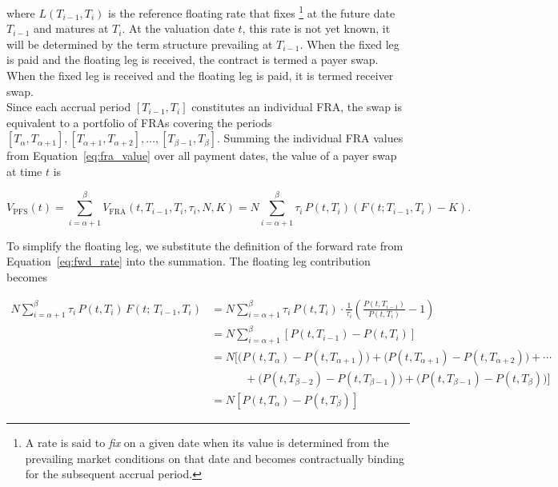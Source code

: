         \noindent
        where $L(T_{i-1}, T_i)$ is the reference floating rate that fixes \footnote{A rate is said to \textit{fix} on a given date when its value is determined from the prevailing market conditions on that date and becomes contractually binding for the subsequent accrual period.}  at the future date $T_{i-1}$ and matures at $T_i$. At the valuation date $t$, this rate is not yet known, it will be determined by the term structure prevailing at $T_{i-1}$. When the fixed leg is paid and the floating leg is received, the contract is termed a payer swap. When the fixed leg is received and the floating leg is paid, it is termed receiver swap.\\

        \noindent
        Since each accrual period $[T_{i-1}, T_i]$ constitutes an individual FRA, the swap is equivalent to a portfolio of FRAs covering the periods $[T_\alpha, T_{\alpha+1}],     [T_{\alpha+1}, T_{\alpha+2}], \ldots, [T_{\beta-1}, T_\beta]$. Summing the individual FRA values from Equation~\eqref{eq:fra_value} over all payment dates, the value of a payer swap at time $t$ is
        
        \begin{equation} \label{eq:pfs_derivation}
          V_{\text{PFS}}(t) = \sum_{i=\alpha+1}^{\beta} V_{\text{FRA}}(t, T_{i-1}, T_i, \tau_i, N, K) = N \sum_{i=\alpha+1}^{\beta} \tau_i \, P(t, T_i) \left( F(t; T_{i-1}, T_i) - K \right).
        \end{equation}
        
        \noindent
        To simplify the floating leg, we substitute the definition of the forward rate from Equation~\eqref{eq:fwd_rate} into the summation. The floating leg contribution becomes
        
        \begin{align}                                                                                     N \sum_{i=\alpha+1}^{\beta} \tau_i \, P(t, T_i) \, F(t;\, T_{i-1}, T_i)                         &= N \sum_{i=\alpha+1}^{\beta} \tau_i \, P(t, T_i) \cdot \frac{1}{\tau_i}\left(\frac{P(t, T_{i-1})}{P(t, T_i)} - 1\right) \nonumber \\                             &= N \sum_{i=\alpha+1}^{\beta} \left[ P(t, T_{i-1}) - P(t, T_i) \right] \nonumber \\
          &= N \Big[\big(P(t,T_\alpha) - P(t,T_{\alpha+1})\big) + \big(P(t,T_{\alpha+1}) - P(t,T_{\alpha+2})\big) + \cdots \nonumber \\
          &\qquad\quad + \big(P(t,T_{\beta-2}) - P(t,T_{\beta-1})\big) + \big(P(t,T_{\beta-1}) - P(t,T_{\beta})\big)\Big] \nonumber \\
          &= N \left[ P(t, T_{\alpha}) - P(t, T_{\beta}) \right] \nonumber \label{eq:float_telescope}
        \end{align}
    
